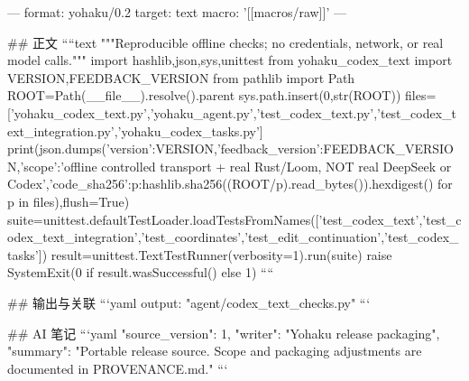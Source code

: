 ---
format: yohaku/0.2
target: text
macro: '[[macros/raw]]'
---

## 正文
````text
"""Reproducible offline checks; no credentials, network, or real model calls."""
import hashlib,json,sys,unittest
from yohaku_codex_text import VERSION,FEEDBACK_VERSION
from pathlib import Path
ROOT=Path(__file__).resolve().parent
sys.path.insert(0,str(ROOT))
files=['yohaku_codex_text.py','yohaku_agent.py','test_codex_text.py','test_codex_text_integration.py','yohaku_codex_tasks.py']
print(json.dumps({'version':VERSION,'feedback_version':FEEDBACK_VERSION,'scope':'offline controlled transport + real Rust/Loom, NOT real DeepSeek or Codex','code_sha256':{p:hashlib.sha256((ROOT/p).read_bytes()).hexdigest() for p in files}}),flush=True)
suite=unittest.defaultTestLoader.loadTestsFromNames(['test_codex_text','test_codex_text_integration','test_coordinates','test_edit_continuation','test_codex_tasks'])
result=unittest.TextTestRunner(verbosity=1).run(suite)
raise SystemExit(0 if result.wasSuccessful() else 1)
````

## 输出与关联
```yaml
output: "agent/codex_text_checks.py"
```

## AI 笔记
```yaml
{"source_version": 1, "writer": "Yohaku release packaging", "summary": "Portable release source. Scope and packaging adjustments are documented in PROVENANCE.md."}
```
